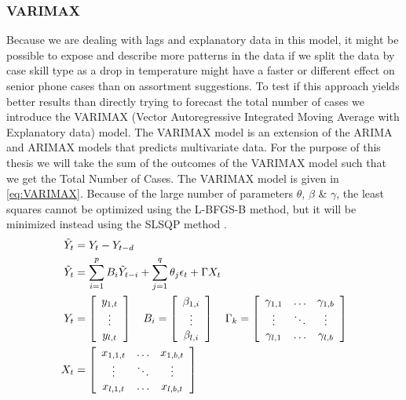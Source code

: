 \subsubsection{VARIMAX}
\label{subsec:varimax}
Because we are dealing with lags and explanatory data in this model, it might be possible to expose and describe more patterns in the data if we split the data by case skill type as a drop in temperature might have a faster or different effect on senior phone cases than on assortment suggestions. To test if this approach yields better results than directly trying to forecast the total number of cases we introduce the VARIMAX (Vector Autoregressive Integrated Moving Average with Explanatory data) model. The VARIMAX model is an extension of the ARIMA and ARIMAX models that predicts multivariate data. For the purpose of this thesis we will take the sum of the outcomes of the VARIMAX model such that we get the Total Number of Cases. The VARIMAX model is given in \autoref{eq:VARIMAX}. Because of the large number of parameters $\theta$, $\beta$ \& $\gamma$, the least squares cannot be optimized using the L-BFGS-B method, but it will be minimized instead using the SLSQP method \citep{SLSQP}.
\begin{equation}
\begin{split}
    \tilde{Y}_t &= Y_t - Y_{t-d}\\
    \tilde{Y}_t &= \sum\limits_{i=1}^p B_i \tilde{Y}_{t-i}  + \sum\limits_{j=1}^q \theta_j \epsilon_t +  \Gamma X_t\\
    Y_t &= \left[\begin{array}{c} y_{1,t}\\ \vdots \\ y_{l, t}\end{array}\right] \quad B_i = \left[\begin{array}{c} \beta_{1, i} \\ \vdots \\ \beta_{l,i} \end{array}\right] \quad \Gamma_k = \left[\begin{array}{c c c}
        \gamma_{1, 1} & \hdots & \gamma_{1, b}\\
        \vdots & \ddots & \vdots\\
        \gamma_{l, 1} & \hdots & \gamma_{l, b}\\
    \end{array}\right]\\
    X_t &= \left[\begin{array}{c c c}
        x_{1, 1, t} & \hdots & x_{1, b, t}\\
        \vdots & \ddots & \vdots\\
        x_{l, 1, t} & \hdots & x_{l, b, t}\\
    \end{array}\right]
\end{split}
\label{eq:VARIMAX}
\end{equation}